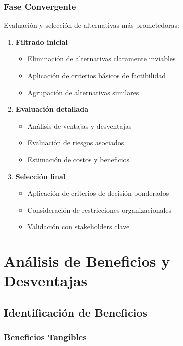 \documentclass[12pt,letterpaper,oneside]{book}
\begin{document}
\subsubsection{Fase Convergente}

Evaluación y selección de alternativas más prometedoras:

\begin{enumerate}
\item \textbf{Filtrado inicial}
   \begin{itemize}
   \item Eliminación de alternativas claramente inviables
   \item Aplicación de criterios básicos de factibilidad
   \item Agrupación de alternativas similares
   \end{itemize}

\item \textbf{Evaluación detallada}
   \begin{itemize}
   \item Análisis de ventajas y desventajas
   \item Evaluación de riesgos asociados
   \item Estimación de costos y beneficios
   \end{itemize}

\item \textbf{Selección final}
   \begin{itemize}
   \item Aplicación de criterios de decisión ponderados
   \item Consideración de restricciones organizacionales
   \item Validación con stakeholders clave
   \end{itemize}
\end{enumerate}

\section{Análisis de Beneficios y Desventajas}

\subsection{Identificación de Beneficios}

\subsubsection{Beneficios Tangibles}
\end{document}
